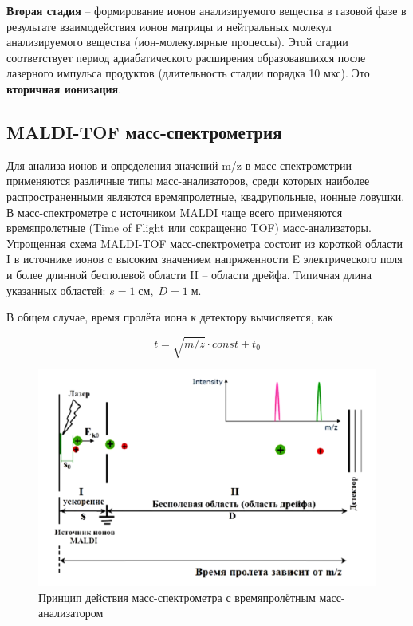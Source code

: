 \documentclass{article}
\begin{document}
\textbf{Вторая стадия} – формирование ионов анализируемого вещества в газовой фазе в результате взаимодействия ионов матрицы и нейтральных молекул анализируемого вещества (ион-молекулярные процессы). Этой стадии соответствует период адиабатического расширения образовавшихся после лазерного импульса продуктов (длительность стадии порядка 10 мкс). Это \textbf{вторичная ионизация}.

\subsection{MALDI-TOF масс-спектрометрия}\;
\par Для анализа ионов и определения значений m/z в масс-спектрометрии применяются различные типы масс-анализаторов, среди которых наиболее распространенными являются времяпролетные, квадрупольные, ионные ловушки. В масс-спектрометре с источником MALDI чаще всего применяются времяпролетные (Time of Flight или сокращенно TOF) масс-анализаторы.
Упрощенная схема MALDI-TOF масс-спектрометра состоит из короткой области I в источнике ионов c высоким значением напряженности E электрического поля и более длинной бесполевой области II – области дрейфа. Типичная длина указанных областей: $s = 1 \; \text{см},\; D = 1 \; \text{м}$. 

В общем случае, время пролёта иона к детектору вычисляется, как

$$
t = \sqrt{m/z}\cdot const + t_0
$$
\begin{figure}[h!]
        \centering
        \includegraphics[scale=0.4]{Images/2025-01-18_23-30-59.png}
        \caption{Принцип действия масс-спектрометра с времяпролётным масс-анализатором}
\end{figure}
\end{document}
